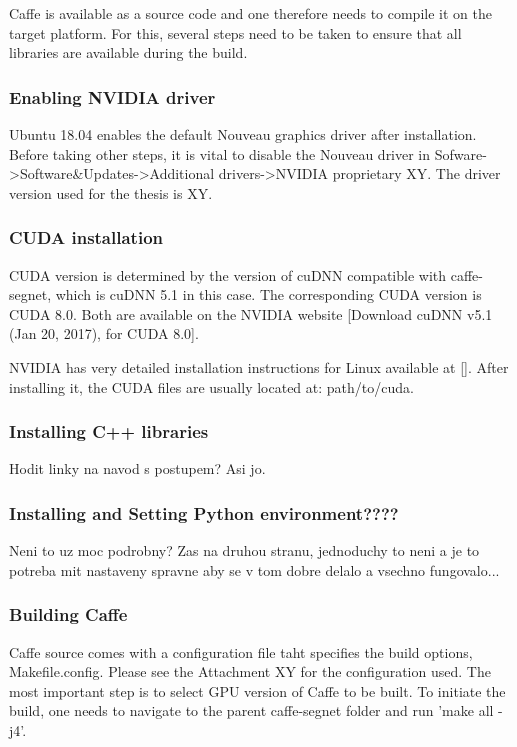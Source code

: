 Caffe is available as a source code and one therefore needs to compile it on the target platform. For this, several steps need to be taken to ensure that all libraries are available during the build.

\subsubsection{Enabling NVIDIA driver}

Ubuntu 18.04 enables the default Nouveau graphics driver after installation. Before taking other steps, it is vital to disable the Nouveau driver in Sofware->Software\&Updates->Additional drivers->NVIDIA proprietary XY. The driver version used for the thesis is XY.

\subsubsection{CUDA installation}

CUDA version is determined by the version of cuDNN compatible with caffe-segnet, which is cuDNN 5.1 in this case. The corresponding CUDA version is CUDA 8.0. Both are available on the NVIDIA website [Download cuDNN v5.1 (Jan 20, 2017), for CUDA 8.0]. 

NVIDIA has very detailed installation instructions for Linux available at []. After installing it, the CUDA files are usually located at: path/to/cuda.

\subsubsection{Installing C++ libraries}

Hodit linky na navod s postupem? Asi jo.

\subsubsection{Installing and Setting Python environment????}

Neni to uz moc podrobny? Zas na druhou stranu, jednoduchy to neni a je to potreba mit nastaveny spravne aby se v tom dobre delalo a vsechno fungovalo...

\subsubsection{Building Caffe}

Caffe source comes with a configuration file taht specifies the build options, Makefile.config. Please see the Attachment XY for the configuration used. The most important step is to select GPU version of Caffe to be built. To initiate the build, one needs to navigate to the parent caffe-segnet folder and run 'make all -j4'.

